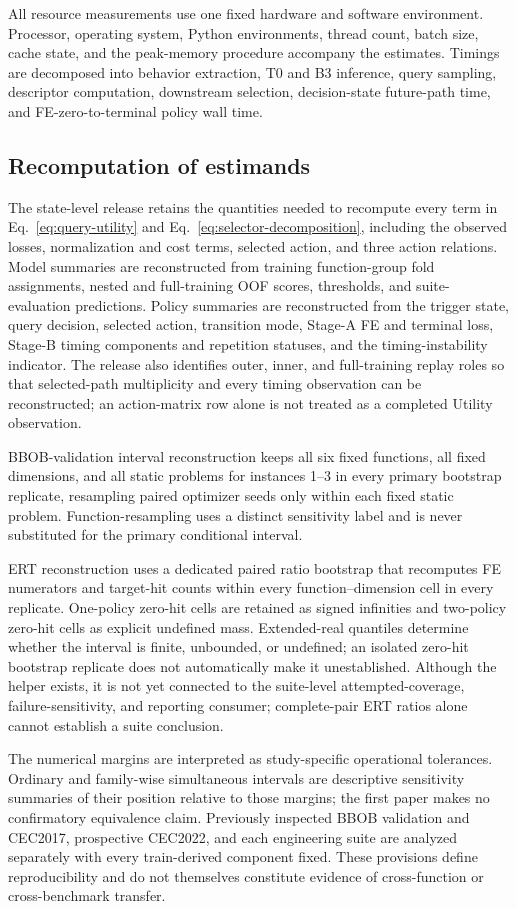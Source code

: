 All resource measurements use one fixed hardware and software environment.
Processor, operating system, Python environments, thread count, batch size,
cache state, and the peak-memory procedure accompany the estimates.  Timings
are decomposed into behavior extraction, T0 and B3 inference, query sampling,
descriptor computation, downstream selection, decision-state future-path time,
and FE-zero-to-terminal policy wall time.

\subsection{Recomputation of estimands}

The state-level release retains the quantities needed to recompute every term
in Eq.~\eqref{eq:query-utility} and Eq.~\eqref{eq:selector-decomposition},
including the observed losses, normalization and cost terms, selected action,
and three action relations.  Model summaries are reconstructed from
training function-group fold assignments, nested and full-training OOF scores,
thresholds, and suite-evaluation predictions.  Policy summaries are reconstructed from
the trigger state, query decision, selected action, transition mode, Stage-A FE
and terminal loss, Stage-B timing components and repetition statuses, and the
timing-instability indicator.
The release also identifies outer, inner, and full-training replay roles so that
selected-path multiplicity and every timing observation can be reconstructed;
an action-matrix row alone is not treated as a completed Utility observation.

BBOB-validation interval reconstruction keeps all six fixed functions, all
fixed dimensions, and all static problems for instances 1--3 in every primary
bootstrap replicate, resampling paired optimizer seeds only within each fixed
static problem.
Function-resampling uses a distinct sensitivity label and is never substituted
for the primary conditional interval.

ERT reconstruction uses a dedicated paired ratio bootstrap that recomputes FE
numerators and target-hit counts within every function--dimension cell in every
replicate.  One-policy zero-hit cells are retained as signed infinities and
two-policy zero-hit cells as explicit undefined mass.  Extended-real quantiles
determine whether the interval is finite, unbounded, or undefined; an isolated
zero-hit bootstrap replicate does not automatically make it unestablished.
Although the helper exists, it is not yet connected to the
suite-level attempted-coverage, failure-sensitivity, and reporting consumer;
complete-pair ERT ratios alone cannot establish a suite conclusion.

The numerical margins are interpreted as study-specific operational
tolerances.  Ordinary and family-wise simultaneous intervals are descriptive
sensitivity summaries of their position relative to those margins; the first
paper makes no confirmatory equivalence claim.  Previously inspected BBOB
validation and CEC2017, prospective CEC2022, and each engineering suite are
analyzed separately with every train-derived component fixed.  These
provisions define reproducibility and do not themselves constitute evidence of
cross-function or cross-benchmark transfer.
